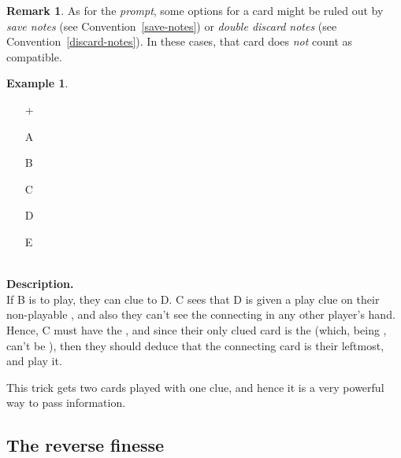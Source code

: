 \documentclass[a4paper]{article}
\theoremstyle{plain}
\theoremstyle{definition}
\newtheorem{remark}[theorem]{Remark}
\newtheorem{example}[theorem]{Example}
\begin{document}
\begin{remark}
	As for the \emph{prompt}, some options for a card might be ruled out by \emph{save notes} (see Convention~\ref{save-notes}) or \emph{double discard notes} (see Convention~\ref{discard-notes}). In these cases, that card does \emph{not} count as compatible.
\end{remark}

\begin{example} \hfill \\
	\begin{minipage}{0.45\textwidth}
		\begin{itemize}
			\item[\Large +]      
			\item[\Large A]    
			\item[\Large B]    
			\item[\Large C]    
			\item[\Large D]    
			\item[\Large E]    
		\end{itemize}
	\end{minipage}%
	\begin{minipage}{0.55\textwidth}
		\hfill \\
		
		\textbf{Description.} \\
		
		If B is to play, they can clue  to D. C sees that D is given a play clue on their non-playable , and also they can't see the connecting  in any other player's hand. Hence, C must have the , and since their only clued card is the  (which, being , can't be ), then they should deduce that the connecting card is their leftmost, and play it.
	\end{minipage}
\end{example} \vspace{0.15 cm}

This trick gets two cards played with one clue, and hence it is a very powerful way to pass information.

\subsection{The reverse finesse}
\end{document}
